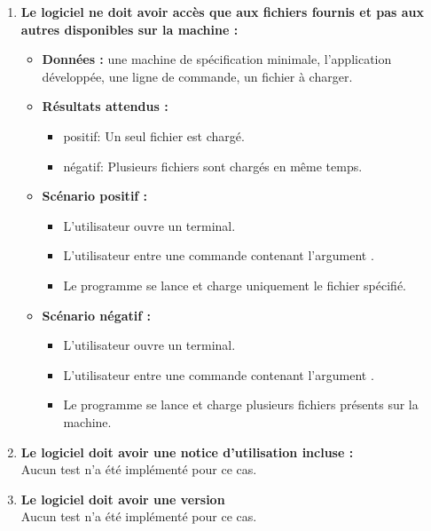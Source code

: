\begin{enumerate}
    \item \textbf{Le logiciel ne doit avoir accès que aux fichiers fournis et pas aux autres disponibles sur la machine :}
    \begin{itemize}
        \item \textbf{Données :} une machine de spécification minimale, l'application développée, une ligne de commande, un fichier à charger.
        \item \textbf{Résultats attendus :}
        \begin{itemize}
            \item positif: Un seul fichier est chargé.
            \item négatif: Plusieurs fichiers sont chargés en même temps.
        \end{itemize}
        \item \textbf{Scénario positif :}
        \begin{itemize}
            \item L’utilisateur ouvre un terminal.
            \item L’utilisateur entre une commande contenant l'argument .
            \item Le programme se lance et charge uniquement le fichier spécifié.
        \end{itemize}
        \item \textbf{Scénario négatif :}
        \begin{itemize}
            \item L’utilisateur ouvre un terminal.
            \item L’utilisateur entre une commande contenant l'argument .
            \item Le programme se lance et charge plusieurs fichiers présents sur la machine.
        \end{itemize}
    \end{itemize}
    
    \item \textbf{Le logiciel doit avoir une notice d'utilisation incluse :} \\
    Aucun test n'a été implémenté pour ce cas.
    
    \item \textbf{Le logiciel doit avoir une version} \\
    Aucun test n'a été implémenté pour ce cas.

\end{enumerate}

